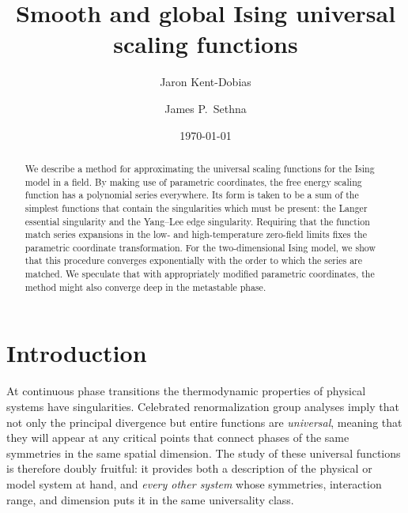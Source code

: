 \documentclass[
aps,
pre,
preprint,
longbibliography,
floatfix
]{revtex4-2}
\begin{document}
\title{Smooth and global Ising universal scaling functions}

\author{Jaron Kent-Dobias}

\author{James P.~Sethna}

\date\today

\begin{abstract}
  We describe a method for approximating the universal scaling functions for
  the Ising model in a field. By making use of parametric coordinates, the free
  energy scaling function has a polynomial series everywhere. Its form is
  taken to be a sum of the simplest functions that contain the singularities
  which must be present: the Langer essential singularity and the Yang--Lee
  edge singularity. Requiring that the function match series expansions in
  the low- and high-temperature zero-field limits fixes the parametric
  coordinate transformation. For the two-dimensional Ising model, we show that
  this procedure converges exponentially with the order to which the series are
  matched. We speculate that with appropriately modified parametric
  coordinates, the method might also converge deep in the metastable phase.
\end{abstract}

\maketitle

\section{Introduction}

At continuous phase transitions the thermodynamic properties of physical
systems have singularities. Celebrated renormalization group analyses imply
that not only the principal divergence but entire functions are
\emph{universal}, meaning that they will appear at any critical points that
connect phases of the same symmetries in the same spatial dimension. The study
of these universal functions is therefore doubly fruitful: it provides both a
description of the physical or model system at hand, and \emph{every other
system} whose symmetries, interaction range, and dimension puts it in the same
universality class.
\end{document}
